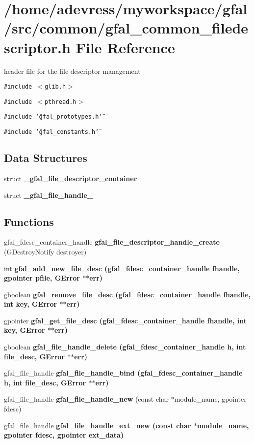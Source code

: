 \section{/home/adevress/myworkspace/gfal/src/common/gfal\_\-common\_\-filedescriptor.h File Reference}
\label{gfal__common__filedescriptor_8h}
header file for the file descriptor management 

{\tt \#include $<$glib.h$>$}\par
{\tt \#include $<$pthread.h$>$}\par
{\tt \#include \char`\"{}gfal\_\-prototypes.h\char`\"{}}\par
{\tt \#include \char`\"{}gfal\_\-constants.h\char`\"{}}\par
\subsection*{Data Structures}
\begin{CompactItemize}
\item 
struct \textbf{\_\-gfal\_\-file\_\-descriptor\_\-container}
\item 
struct \textbf{\_\-gfal\_\-file\_\-handle\_\-}
\end{CompactItemize}
\subsection*{Functions}
\begin{CompactItemize}
\item 
gfal\_\-fdesc\_\-container\_\-handle \textbf{gfal\_\-file\_\-descriptor\_\-handle\_\-create} (GDestroy\-Notify destroyer)\label{gfal__common__filedescriptor_8h_13934d51ad328aabb0721ef7793ad233}

\item 
int \bf{gfal\_\-add\_\-new\_\-file\_\-desc} (gfal\_\-fdesc\_\-container\_\-handle fhandle, gpointer pfile, GError $\ast$$\ast$err)
\item 
gboolean \bf{gfal\_\-remove\_\-file\_\-desc} (gfal\_\-fdesc\_\-container\_\-handle fhandle, int key, GError $\ast$$\ast$err)
\item 
gpointer \bf{gfal\_\-get\_\-file\_\-desc} (gfal\_\-fdesc\_\-container\_\-handle fhandle, int key, GError $\ast$$\ast$err)
\item 
gboolean \bf{gfal\_\-file\_\-handle\_\-delete} (gfal\_\-fdesc\_\-container\_\-handle h, int file\_\-desc, GError $\ast$$\ast$err)
\item 
gfal\_\-file\_\-handle \bf{gfal\_\-file\_\-handle\_\-bind} (gfal\_\-fdesc\_\-container\_\-handle h, int file\_\-desc, GError $\ast$$\ast$err)
\item 
gfal\_\-file\_\-handle \textbf{gfal\_\-file\_\-handle\_\-new} (const char $\ast$module\_\-name, gpointer fdesc)\label{gfal__common__filedescriptor_8h_5891a96d47726421216140dba73f5e27}

\item 
gfal\_\-file\_\-handle \bf{gfal\_\-file\_\-handle\_\-ext\_\-new} (const char $\ast$module\_\-name, gpointer fdesc, gpointer ext\_\-data)
\end{CompactItemize}


